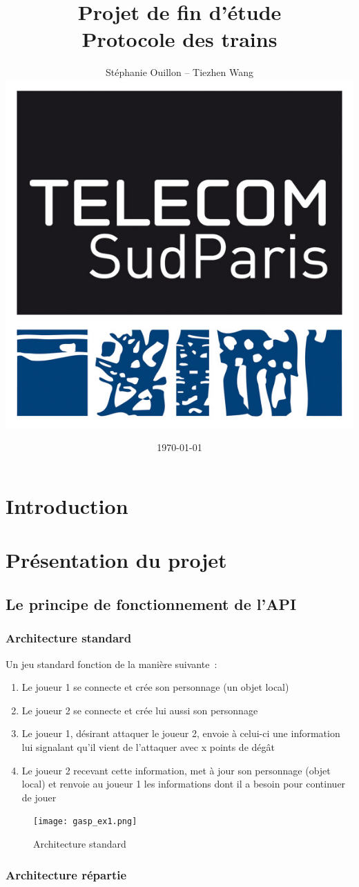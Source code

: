 \documentclass[a4paper,10pt]{report}
\title{Projet de fin d'étude \\ Protocole des trains}
\author{Stéphanie Ouillon -- Tiezhen Wang \\ \includegraphics[scale=0.3]{img/int.jpg}}
\date{\today}
\begin{document}
\maketitle

\tableofcontents

\chapter*{Introduction}

\chapter{Présentation du projet}

\section{Le principe de fonctionnement de l'API}

\subsection{Architecture standard}

Un jeu standard fonction de la manière suivante~:
\begin{enumerate}
  \item Le joueur 1 se connecte et crée son personnage (un objet local)
  \item Le joueur 2 se connecte et crée lui aussi son personnage
  \item Le joueur 1, désirant attaquer le joueur 2, envoie à celui-ci une information lui signalant qu'il vient de l'attaquer avec x points de dégât
  \item Le joueur 2 recevant cette information, met à jour son personnage (objet local) et renvoie au joueur 1 les informations dont il a besoin pour continuer de jouer
\end{enumerate}

\begin{figure}[!hb]
  \begin{center}
    \texttt{[image: gasp\_ex1.png]}
  \end{center}
  \caption{\label{gasp_ex1}Architecture standard}
\end{figure}

\subsection{Architecture répartie}
\end{document}
